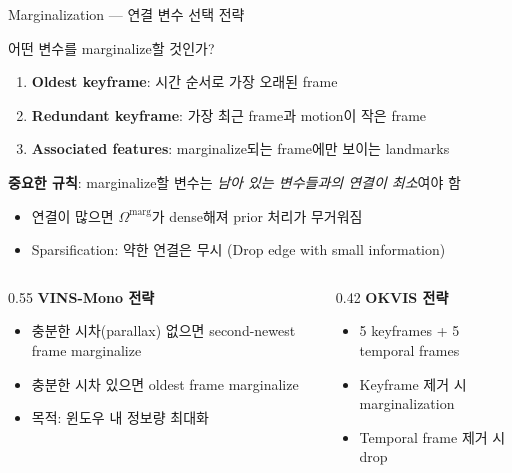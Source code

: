 \begin{frame}[shrink=10]{Marginalization — 연결 변수 선택 전략}
  \begin{block}{어떤 변수를 marginalize할 것인가?}
    \begin{enumerate}
      \item \textbf{Oldest keyframe}: 시간 순서로 가장 오래된 frame
      \item \textbf{Redundant keyframe}: 가장 최근 frame과 motion이 작은 frame
      \item \textbf{Associated features}: marginalize되는 frame에만 보이는 landmarks
    \end{enumerate}
  \end{block}
  \pause
  \textbf{중요한 규칙}: marginalize할 변수는 \emph{남아 있는 변수들과의 연결이 최소}여야 함
  \begin{itemize}
    \item 연결이 많으면 $\Omega^{\mathrm{marg}}$가 dense해져 prior 처리가 무거워짐
    \item Sparsification: 약한 연결은 무시 (Drop edge with small information)
  \end{itemize}
  \pause
  \begin{columns}[T]
    \begin{column}{0.55\textwidth}
      \textbf{VINS-Mono 전략}
      \begin{itemize}
        \item 충분한 시차(parallax) 없으면 second-newest frame marginalize
        \item 충분한 시차 있으면 oldest frame marginalize
        \item 목적: 윈도우 내 정보량 최대화
      \end{itemize}
    \end{column}
    \begin{column}{0.42\textwidth}
      \textbf{OKVIS 전략}
      \begin{itemize}
        \item 5 keyframes + 5 temporal frames
        \item Keyframe 제거 시 marginalization
        \item Temporal frame 제거 시 drop
      \end{itemize}
    \end{column}
  \end{columns}
\end{frame}

